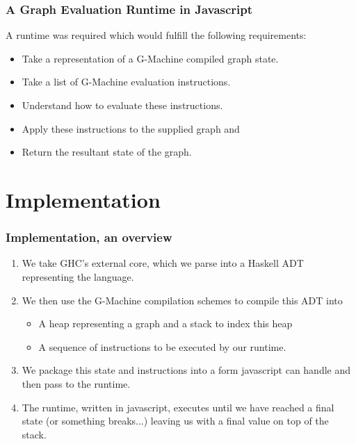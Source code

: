 \documentclass{beamer}
\begin{document}
\begin{frame}
	\frametitle{A Graph Evaluation Runtime in Javascript}
	A runtime was required which would fulfill the following
	requirements:
	\begin{itemize}
		\item Take a representation of a G-Machine compiled
			  graph state.
		\item Take a list of G-Machine evaluation instructions.
		\item Understand how to evaluate these instructions.
		\item Apply these instructions to the supplied graph and
		\item Return the resultant state of the graph.
	\end{itemize}	
	
\end{frame}

\section{Implementation}

\begin{frame}
	\frametitle{Implementation, an overview}
	\begin{enumerate}
	\item We take GHC's external core, which we parse into a
	Haskell ADT representing the language. 
	\item We then use the G-Machine compilation schemes to 
	compile this ADT into 
		\begin{itemize}
			\item A heap representing a graph and a stack
			to index this heap
			\item A sequence of instructions to be executed 
			by our runtime.
		\end{itemize}
	\item We package this state and instructions into a 
	form javascript can handle and then pass to the runtime.
	\item The runtime, written in javascript, executes until
	we have reached a final state (or something breaks...) 
	leaving us with a final value on top of the stack.
	\end{enumerate}
\end{frame}
\end{document}
